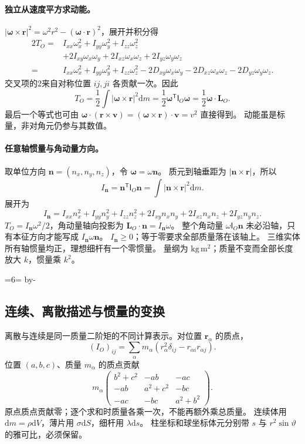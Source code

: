 \documentclass[UTF8,zihao=-4,fontset=fandol,a4paper]{ctexart}
\makeatletter
\newcommand{\vect}[1]{\bm{#1}}
\newcommand{\dd}{\mathrm d}
\newcommand{\Needspace}[1]{\par\if@nobreak\else\penalty0\begingroup\dimen0=#1\relax\dimen2=\pagegoal\advance\dimen2 by-\pagetotal\ifdim\dimen0>\dimen2\newpage\fi\endgroup\fi}
\let\SavedSubsection\subsection
\renewcommand{\subsection}{\Needspace{6\baselineskip}\SavedSubsection}
\makeatother
\begin{document}
\paragraph{独立从速度平方求动能。}
$|\vect\omega\times\vect r|^2=\omega^2r^2-(\vect\omega\cdot\vect r)^2$，展开并积分得
\begin{align*}
2T_O={}&I_{xx}\omega_x^2+I_{yy}\omega_y^2+I_{zz}\omega_z^2\\
&+2I_{xy}\omega_x\omega_y+2I_{xz}\omega_x\omega_z+2I_{yz}\omega_y\omega_z\\
={}&I_{xx}\omega_x^2+I_{yy}\omega_y^2+I_{zz}\omega_z^2
-2D_{xy}\omega_x\omega_y-2D_{xz}\omega_x\omega_z-2D_{yz}\omega_y\omega_z.
\end{align*}
交叉项的2来自对称位置 $ij,ji$ 各贡献一次。因此
\[
T_O=\frac12\int|\vect\omega\times\vect r|^2\dd m
=\frac12\vect\omega^{\mathsf T}\mathsf I_O\vect\omega
=\frac12\vect\omega\cdot\vect L_O.
\]
最后一个等式也可由
$\vect\omega\cdot(\vect r\times\vect v)
=(\vect\omega\times\vect r)\cdot\vect v=v^2$ 直接得到。
动能虽是标量，非对角元仍参与其数值。

\paragraph{任意轴惯量与角动量方向。}
取单位方向 $\vect n=(n_x,n_y,n_z)$，令 $\vect\omega=\omega\vect n$。
质元到轴垂距为 $|\vect n\times\vect r|$，所以
\begin{equation}\label{eq:directioninertia}
I_{\vect n}=\vect n^{\mathsf T}\mathsf I_O\vect n
=\int|\vect n\times\vect r|^2\dd m.
\end{equation}
展开为
\[
I_{\vect n}=I_{xx}n_x^2+I_{yy}n_y^2+I_{zz}n_z^2
+2I_{xy}n_xn_y+2I_{xz}n_xn_z+2I_{yz}n_yn_z.
\]
$T_O=I_{\vect n}\omega^2/2$，角动量轴向投影为
$\vect L_O\cdot\vect n=I_{\vect n}\omega$。
整个角动量 $\omega\mathsf I_O\vect n$ 未必沿轴，只有本征方向才能写成 $I_{\vect n}\omega\vect n$。
$I_{\vect n}\ge0$；等于零要求全部质量落在该轴上。
三维实体所有轴惯量均正，理想细杆有一个零惯量。
量纲为 $\mathrm{kg\,m^2}$；质量不变而全部长度放大 $k$，惯量乘 $k^2$。

\subsection{连续、离散描述与惯量的变换}\label{sub:c3-5.2}
离散与连续是同一质量二阶矩的不同计算表示。对位置 $\vect r_\alpha$ 的质点，
\[
(I_O)_{ij}=\sum_\alpha m_\alpha
(r_\alpha^2\delta_{ij}-r_{\alpha i}r_{\alpha j}).
\]
位置 $(a,b,c)$、质量 $m_\alpha$ 的质点贡献
\[
m_\alpha\begin{pmatrix}b^2+c^2&-ab&-ac\\-ab&a^2+c^2&-bc\\-ac&-bc&a^2+b^2\end{pmatrix}.
\]
原点质点贡献零；逐个求和时质量各乘一次，不能再额外乘总质量。
连续体用 $\dd m=\rho\dd V$，薄片用 $\sigma\dd S$，细杆用 $\lambda\dd s$。
柱坐标和球坐标体元分别带 $s$ 与 $r^2\sin\vartheta$ 的雅可比，必须保留。
\end{document}

